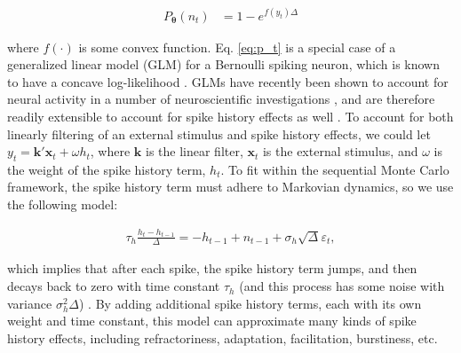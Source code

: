 \documentclass[12pt]{article}
\providecommand{\ve}[1]{\boldsymbol{#1}}
\providecommand{\ve}[1]{\boldsymbol{#1}}
\newcommand{\thetn}{\ve{\theta}}
\newcommand{\p}{P_{\thetn}}
\begin{document}
\begin{align} \label{eq:p_t}
\p(n_t) &= 1 - e^{f(y_t) \Delta}
\end{align}

\noindent where $f(\cdot)$ is some convex function. Eq. \ref{eq:p_t} is a special case of a generalized linear model (GLM) \cite{McCullaghNelder89} for a Bernoulli spiking neuron, which is known to have a concave log-likelihood \cite{EscolaPaninski08}.  GLMs have recently been shown to account for neural activity in a number of neuroscientific investigations \cite{Paninski04}, and are therefore readily extensible to account for spike history effects as well \cite{TruccoloBrown05}. To account for both linearly filtering of an external stimulus and spike history effects, we could let $y_t=\ve{k}'\ve{x}_t+\omega h_t$, where $\ve{k}$ is the linear filter, $\ve{x}_t$ is the external stimulus, and $\omega$ is the weight of the spike history term, $h_t$. To fit within the sequential Monte Carlo framework, the spike history term must adhere to Markovian dynamics, so we use the following model:
  
%
%
%
%

\begin{align} \label{eq:h_t}
\tau_h \frac{h_t - h_{t-1}}{\Delta} = -h_{t-1} + n_{t-1} + \sigma_{h} \sqrt{\Delta} \varepsilon_{t},
\end{align}

\noindent which implies that after each spike, the spike history term jumps, and then decays back to zero with time constant $\tau_h$ (and this process has some noise with variance $\sigma_h^2 \Delta$) \cite{Paninski04}. By adding additional spike history terms, each with its own weight and time constant, this model can approximate many kinds of spike history effects, including refractoriness, adaptation, facilitation, burstiness, etc.
\end{document}
